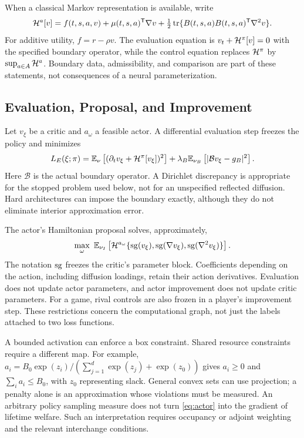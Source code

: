 When a classical Markov representation is available, write
\begin{equation}
 \mathcal H^a[v]=f(t,s,a,v)+\mu(t,s,a)^{\mathsf T}\nabla v
      +\tfrac12\operatorname{tr}\{B(t,s,a)B(t,s,a)^{\mathsf T}\nabla^2v\}.
 \label{eq:hamiltonian}
\end{equation}
For additive utility, $f=r-\rho v$. The evaluation equation is $v_t+\mathcal H^\pi[v]=0$ with the specified boundary operator, while the control equation replaces $\mathcal H^\pi$ by $\sup_{a\in A}\mathcal H^a$. Boundary data, admissibility, and comparison are part of these statements, not consequences of a neural parameterization.

\subsection{Evaluation, Proposal, and Improvement}
Let $v_\xi$ be a critic and $a_\omega$ a feasible actor. A differential evaluation step freezes the policy and minimizes
\begin{equation}
 L_E(\xi;\pi)=\mathbb E_\nu\left[(\partial_t v_\xi+\mathcal H^\pi[v_\xi])^2\right]
       +\lambda_B\mathbb E_{\nu_B}\left[|\mathcal Bv_\xi-g_B|^2\right].
 \label{eq:critic}
\end{equation}
Here $\mathcal B$ is the actual boundary operator. A Dirichlet discrepancy is appropriate for the stopped problem used below, not for an unspecified reflected diffusion. Hard architectures can impose the boundary exactly, although they do not eliminate interior approximation error.

The actor's Hamiltonian proposal solves, approximately,
\begin{equation}
 \max_\omega\ \mathbb E_{\nu_I}\left[
 \mathcal H^{a_\omega}\{\operatorname{sg}(v_\xi),\operatorname{sg}(\nabla v_\xi),\operatorname{sg}(\nabla^2v_\xi)\}\right].
 \label{eq:actor}
\end{equation}
The notation $\operatorname{sg}$ freezes the critic's parameter block. Coefficients depending on the action, including diffusion loadings, retain their action derivatives. Evaluation does not update actor parameters, and actor improvement does not update critic parameters. For a game, rival controls are also frozen in a player's improvement step. These restrictions concern the computational graph, not just the labels attached to two loss functions.

A bounded activation can enforce a box constraint. Shared resource constraints require a different map. For example, $a_i=B_0\exp(z_i)/(\sum_{j=1}^d\exp(z_j)+\exp(z_0))$ gives $a_i\geq0$ and $\sum_i a_i\leq B_0$, with $z_0$ representing slack. General convex sets can use projection; a penalty alone is an approximation whose violations must be measured. An arbitrary policy sampling measure does not turn \eqref{eq:actor} into the gradient of lifetime welfare. Such an interpretation requires occupancy or adjoint weighting and the relevant interchange conditions.

